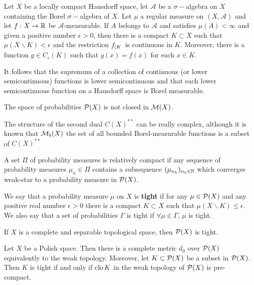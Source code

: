 \begin{theorem}[Luizin]
	Let $X$ be a locally compact Hausdorff space, let $\mathcal A$ be a $\sigma-$algebra on $X$ containing the Borel $\sigma-$algebra of $X$. Let $\mu$ a regular measure on $(X, \mathcal A)$ and let $f:X\rightarrow \Real$ be $\mathcal A$-measurable. If $A$ belongs to $\mathcal{A}$ and satisfies $\mu(A)<\infty$ and given a positive number $\epsilon>0$, then there is a compact $K\subset X$ such that $\mu(X\backslash K)<\epsilon$ and the restriction $\domainrestr{K}{f}$ is continuous in $K$. Moreover, there is a function $g\in C_c(K)$ such that $g(x)=f(x)$ for each $x\in K$. 
\end{theorem}

It follows that the supremum of a collection of continuous (or lower semicontinuous) functions is lower semicontinuous and that each lower semicontinuous function on a Hausdorff space is Borel measurable. 


The space of probabilities $\PlanSp(X)$ is not closed in $\MeasureSp(X)$. 


The structure of the second dual $C(X)^{**}$ can be really complex, although it is known that $\MeasureSp_b(X)$ the set of all bounded Borel-measurable functions is a subset of $C(X)^{**}$

A set $\Pi$ of probability measures is relatively compact if any sequence of probability measures $\mu_n \in \Pi$ contains a subsequence $(\mu_{n_k})_{n_k\in \Naturals}$ which converges weak-star to a probability measure in $\PlanSp(X)$.

We say that a probability measure $\mu$ on $X$ is \textbf{tight} if for any $\mu\in \PlanSp(X)$ and any positive real number $\epsilon>0$ there is a compact $K\subset X$ such that $\mu(X\backslash K)\leq \epsilon$. We also say that a set of probabilities $\Gamma$ is tight if $\forall \mu \in \Gamma$, $\mu$ is tight.

\begin{theorem}
	If $X$ is a complete and separable topological space, then $\PlanSp(X)$ is tight.
\end{theorem}

\begin{theorem}
	Let $X$ be a Polish space. Then there is a complete metric $d_0$ over $\PlanSp(X)$ equivalently to the weak topology. Moreover, let $K\subset \PlanSp(X)$ be a subset in $\PlanSp(X)$. Then $K$ is tight if and only if $\closu K$ in the weak topology of $\PlanSp(X)$ is pre-compact.
\end{theorem}

